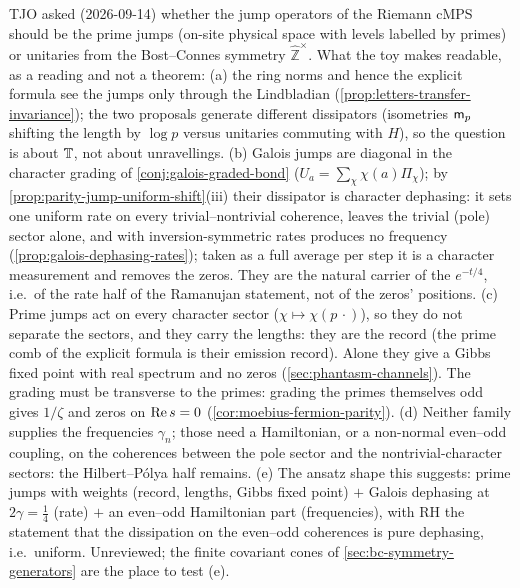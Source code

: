 \begin{observation}
\label{obs:jump-operator-guidance}
TJO asked (2026-09-14) whether the jump operators of the Riemann cMPS should be the prime jumps
(on-site physical space with levels labelled by primes) or unitaries from the Bost--Connes symmetry
$\hat{\mathbb Z}^\times$. What the toy makes readable, as a reading and not a theorem: (a) the ring
norms and hence the explicit formula see the jumps only through the Lindbladian
(\cref{prop:letters-transfer-invariance}); the two proposals generate different dissipators
(isometries $\mathsf m_{p}$ shifting the length by $\log p$ versus unitaries commuting with $H$), so the
question is about $\mathbb T$, not about unravellings. (b) Galois jumps are diagonal in the character
grading of \cref{conj:galois-graded-bond} ($U_a = \sum_\chi\chi(a)\Pi_\chi$); by
\cref{prop:parity-jump-uniform-shift}(iii) their dissipator is character dephasing: it sets one
uniform rate on every trivial--nontrivial coherence, leaves the trivial (pole) sector alone, and with inversion-symmetric rates produces no
frequency (\cref{prop:galois-dephasing-rates}); taken as a full average per step it is a character measurement and removes the
zeros. They are the natural carrier of the $e^{-t/4}$, i.e.\ of the rate half of the Ramanujan
statement, not of the zeros' positions. (c) Prime jumps act on every character sector
($\chi\mapsto\chi(p\,\cdot)$), so they do not separate the sectors, and they carry the lengths: they
are the record (the prime comb of the explicit formula is their emission record). Alone they give a
Gibbs fixed point with real spectrum and no zeros (\cref{sec:phantasm-channels}). The grading must be
transverse to the primes: grading the primes themselves odd gives $1/\zeta$ and zeros on $\operatorname{Re} s = 0$
(\cref{cor:moebius-fermion-parity}). (d) Neither family supplies the frequencies $\gamma_n$; those
need a Hamiltonian, or a non-normal even--odd coupling, on the coherences between the pole sector and
the nontrivial-character sectors: the Hilbert--P\'olya half remains. (e) The ansatz shape this
suggests: prime jumps with weights (record, lengths, Gibbs fixed point) $+$ Galois dephasing at
$2\gamma = \tfrac14$ (rate) $+$ an even--odd Hamiltonian part (frequencies), with RH the statement
that the dissipation on the even--odd coherences is pure dephasing, i.e.\ uniform. Unreviewed;
the finite covariant cones of \cref{sec:bc-symmetry-generators} are the place to test (e).
\end{observation}

